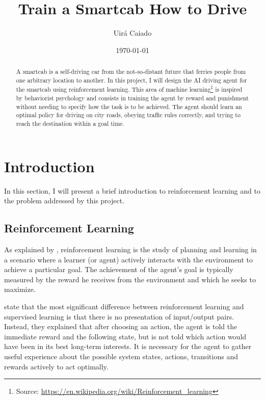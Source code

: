 \documentclass[a4paper]{article}
\title{Train a Smartcab How to Drive}
\author{Uirá Caiado}
\date{\today}
\begin{document}
\maketitle

\begin{abstract}
A smartcab is a self-driving car from the not-so-distant future that ferries people from one arbitrary location to another. In this project, I will design the AI driving agent for the smartcab using reinforcement learning. This area of machine learning\footnote{Source: \url{https://en.wikipedia.org/wiki/Reinforcement_learning}} is inspired by behaviorist psychology and consists in training the agent by reward and punishment without needing to specify how the task is to be achieved. The agent should learn an optimal policy for driving on city roads, obeying traffic rules correctly, and trying to reach the destination within a goal time.
\end{abstract}


\section{Introduction}
\label{sec:introduction}
In this section, I will present a brief introduction to reinforcement learning and to the problem addressed by this project.

\subsection{Reinforcement Learning}
As explained by \cite{Mohri_2012}, reinforcement learning is the study of planning and learning in a scenario where a learner (or agent) actively interacts with the environment to achieve a particular goal. The achievement of the agent's goal is typically measured by the reward he receives from the environment and which he seeks to maximize.

\cite{Kaelbling_1996} state that the most significant difference between reinforcement learning and supervised learning is that there is no presentation of input/output pairs. Instead, they explained that after choosing an action, the agent is told the immediate reward and the following state, but is not told which action would have been in its best long-term interests. It is necessary for the agent to gather useful experience about the possible system states, actions, transitions and rewards actively to act optimally.
\end{document}

